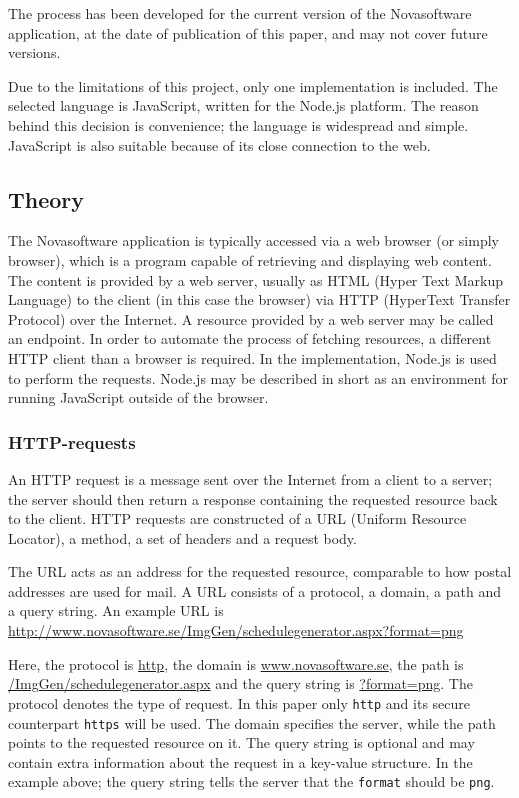 \documentclass{article}
\begin{document}
	The process has been developed for the current version of the Novasoftware application, at the date of publication of this paper, and may not cover future versions.
	
	Due to the limitations of this project, only one implementation is included. The selected language is JavaScript, written for the Node.js platform. The reason behind this decision is convenience; the language is widespread and simple. JavaScript is also suitable because of its close connection to the web.
	
	\subsection{Theory}
	
	The Novasoftware application is typically accessed via a web browser (or simply browser), which is a program capable of retrieving and displaying web content. The content is provided by a web server, usually as HTML (Hyper Text Markup Language) to the client (in this case the browser) via HTTP (HyperText Transfer Protocol) over the Internet.\cite{wikipedia web browser} A resource provided by a web server may be called an endpoint. In order to automate the process of fetching resources, a different HTTP client than a browser is required. In the implementation, Node.js is used to perform the requests. Node.js may be described in short as an environment for running JavaScript outside of the browser.\cite{wikipedia node.js}
	
	\subsubsection{HTTP-requests}
	An HTTP request is a message sent over the Internet from a client to a server; the server should then return a response containing the requested resource back to the client. HTTP requests are constructed of a URL (Uniform Resource Locator), a method, a set of headers and a request body.
	
	The URL acts as an address for the requested resource, comparable to how postal addresses are used for mail. A URL consists of a protocol, a domain, a path and a query string. An example URL is\\
	\url{http://www.novasoftware.se/ImgGen/schedulegenerator.aspx?format=png}
	
	Here, the protocol is \url{http}, the domain is \url{www.novasoftware.se}, the path is \url{/ImgGen/schedulegenerator.aspx} and the query string is \url{?format=png}.
	The protocol denotes the type of request. In this paper only \texttt{http} and its secure counterpart \texttt{https} will be used. The domain specifies the server, while the path points to the requested resource on it. The query string is optional and may contain extra information about the request in a key-value structure. In the example above; the query string tells the server that the \texttt{format} should be \texttt{png}.
	
\end{document}
